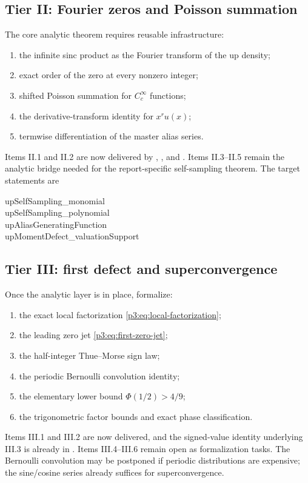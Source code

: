 \documentclass[11pt,oneside]{article}
\numberwithin{equation}{section}
\theoremstyle{definition}
\theoremstyle{remark}
\begin{document}
\subsection{Tier II: Fourier zeros and Poisson summation}

The core analytic theorem requires reusable infrastructure:
\begin{enumerate}[label=\textbf{II.\arabic*}]
\item the infinite sinc product as the Fourier transform of the up density;
\item exact order of the zero at every nonzero integer;
\item shifted Poisson summation for $C_c^\infty$ functions;
\item the derivative-transform identity for $x^ru(x)$;
\item termwise differentiation of the master alias series.
\end{enumerate}
Items II.1 and II.2 are now delivered by ,
, and
.  Items II.3--II.5 remain the analytic
bridge needed for the report-specific self-sampling theorem.
The target statements are
\begin{center}
\begin{minipage}{0.86\textwidth}\small\ttfamily
upSelfSampling\_monomial\\
upSelfSampling\_polynomial\\
upAliasGeneratingFunction\\
upMomentDefect\_valuationSupport
\end{minipage}
\end{center}

\subsection{Tier III: first defect and superconvergence}

Once the analytic layer is in place, formalize:
\begin{enumerate}[label=\textbf{III.\arabic*}]
\item the exact local factorization \eqref{p3:eq:local-factorization};
\item the leading zero jet \eqref{p3:eq:first-zero-jet};
\item the half-integer Thue--Morse sign law;
\item the periodic Bernoulli convolution identity;
\item the elementary lower bound $\Phi(1/2)>4/9$;
\item the trigonometric factor bounds and exact phase classification.
\end{enumerate}
Items III.1 and III.2 are now delivered, and the signed-value identity
underlying III.3 is already in .  Items
III.4--III.6 remain open as formalization tasks.
The Bernoulli convolution may be postponed if periodic distributions are expensive; the sine/cosine series already suffices for superconvergence.
\end{document}
